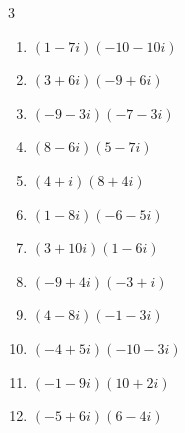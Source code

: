 \begin{multicols}{3}
\begin{enumerate}
        \phantom{$\displaystyle =76-i$}

  \item $\displaystyle (1-7i)(-10-10i)$

        \phantom{$\displaystyle =-80+60i$}

  \item $\displaystyle (3+6i)(-9+6i)$

        \phantom{$\displaystyle =-63-36i$}

  \item $\displaystyle (-9-3i)(-7-3i)$

        \phantom{$\displaystyle =54+48i$}

\columnbreak %

\resetques

  \item $\displaystyle (8-6i)(5-7i)$

        \phantom{$\displaystyle =-2-86i$}

  \item $\displaystyle (4+i)(8+4i)$

        \phantom{$\displaystyle =28+24i$}

  \item $\displaystyle (1-8i)(-6-5i)$

        \phantom{$\displaystyle =-46+43i$}

  \item $\displaystyle (3+10i)(1-6i)$

        \phantom{$\displaystyle =63-8i$}

  \item $\displaystyle (-9+4i)(-3+i)$

        \phantom{$\displaystyle =23-21i$}

  \item $\displaystyle (4-8i)(-1-3i)$

        \phantom{$\displaystyle =-28-4i$}

  \item $\displaystyle (-4+5i)(-10-3i)$

        \phantom{$\displaystyle =55-38i$}

  \item $\displaystyle (-1-9i)(10+2i)$

        \phantom{$\displaystyle =8-92i$}

  \item $\displaystyle (-5+6i)(6-4i)$

        \phantom{$\displaystyle =-6+56i$}


\end{enumerate}
\end{multicols}
